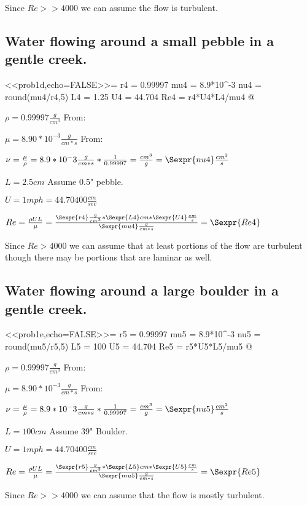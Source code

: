 \documentclass{article}
\begin{document}
Since $Re >> 4000$ we can assume the flow is turbulent.

\subsection{Water flowing around a small pebble in a gentle creek.}

<<prob1d,echo=FALSE>>=
r4 = 0.99997
mu4 = 8.9*10^-3
nu4 = round(mu4/r4,5)
L4 = 1.25
U4 = 44.704
Re4 = r4*U4*L4/mu4
@

$\rho = 0.99997 \frac{g}{cm^{3}}$ From: ~\cite{WatProp}

$\mu = 8.90*10^{-3} \frac{g}{cm*s}$  From: ~\cite{WatProp} 

$\nu = \frac{\mu}{\rho} = 8.9*10^-3 \frac{g}{cm*s} * \frac{1}{0.99997}
= \frac{cm^{3}}{g} = \Sexpr{nu4} \frac{cm^{2}}{s}$

$L = 2.5 cm$ Assume 0.5" pebble. 

$U = 1mph = 44.70400 \frac{cm}{sec}$

$Re = \frac{\rho UL}{\mu} = \frac{\Sexpr{r4} \frac{g}{cm^{3}}*\Sexpr{L4} cm *
\Sexpr{U4} \frac{cm}{s}}{\Sexpr{mu4} \frac{g}{cm*s}} = \Sexpr{Re4}$

Since $Re > 4000$ we can assume that at least portions of the flow are turbulent
though there may be portions that are laminar as well.


\subsection{Water flowing around a large boulder in a gentle creek.}

<<prob1e,echo=FALSE>>=
r5 = 0.99997
mu5 = 8.9*10^-3
nu5 = round(mu5/r5,5)
L5 = 100
U5 = 44.704
Re5 = r5*U5*L5/mu5
@

$\rho = 0.99997 \frac{g}{cm^{3}}$ From: ~\cite{WatProp}

$\mu = 8.90*10^{-3} \frac{g}{cm*s}$  From: ~\cite{WatProp} 

$\nu = \frac{\mu}{\rho} = 8.9*10^-3 \frac{g}{cm*s} * \frac{1}{0.99997}
= \frac{cm^{3}}{g} = \Sexpr{nu5} \frac{cm^{2}}{s}$

$L = 100 cm$ Assume 39" Boulder. 

$U = 1mph = 44.70400 \frac{cm}{sec}$

$Re = \frac{\rho UL}{\mu} = \frac{\Sexpr{r5} \frac{g}{cm^{3}}*\Sexpr{L5} cm *
\Sexpr{U5} \frac{cm}{s}}{\Sexpr{mu5} \frac{g}{cm*s}} = \Sexpr{Re5}$

Since $Re >> 4000$ we can assume that the flow is mostly turbulent.
\end{document}
